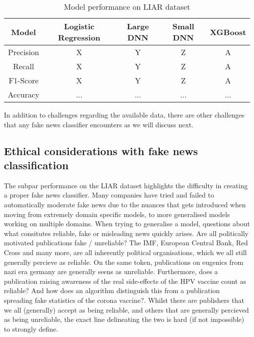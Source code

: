 \begin{table}[htpb]
  \centering
  \caption{Model performance on LIAR dataset}
  \label{tab:liarperformance}

  \begin{tabular}{c|cccc}
    Model & Logistic Regression & Large DNN & Small DNN & XGBoost \\ \hline
    Precision & X & Y & Z & A \\ \hline
    Recall & X & Y & Z & A \\ \hline
    F1-Score & X & Y & Z & A \\ \hline
    Accuracy & ... & ... & ... & ... \\ \hline
  \end{tabular}
\end{table}

In addition to challenges regarding the available data, there are other challenges that any fake news classifier
encounters as we will discuss next.

\subsection{Ethical considerations with fake news classification}
The subpar performance on the LIAR dataset highlights the difficulty in creating a proper fake news classifier. Many
companies have tried and failed to automatically moderate fake news due to the nuances that gets introduced when moving
from extremely domain specific models, to more generalised models working on multiple domains. When trying to
generalise a model, questions about what consitutes reliable, fake or misleading news quickly arises. Are all
politically motivated publications fake / unreliable? The IMF, European Central Bank, Red Cross and many more, are all
inherently political organisations, which we all still generally percieve as reliable. On the same token, publications
on eugenics from nazi era germany are generally seens as unreliable. Furthermore, does a publication raising awareness
of the real side-effects of the HPV vaccine count as reliable? And how does an algorithm distinguish this from a
publication spreading fake statistics of the corona vaccine?. Whilst there are publishers that we all (generally)
accept as being reliable, and others that are generally percieved as being unreliable, the exact line delineating the
two is hard (if not impossible) to strongly define.
